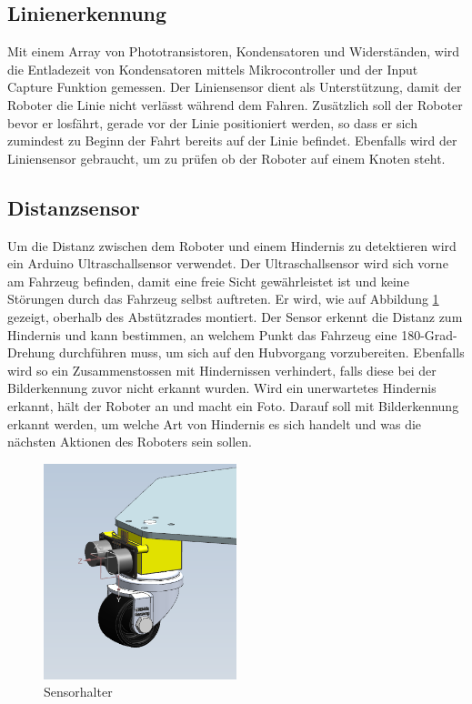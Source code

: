 \subsection{Linienerkennung}

Mit einem Array von Phototransistoren, Kondensatoren und Widerständen, wird die Entladezeit von Kondensatoren mittels Mikrocontroller und der Input Capture Funktion gemessen. Der Liniensensor dient als Unterstützung, damit der Roboter die Linie nicht verlässt während dem Fahren. Zusätzlich soll der Roboter bevor er losfährt, gerade vor der Linie positioniert werden, so dass er sich zumindest zu Beginn der Fahrt bereits auf der Linie befindet. Ebenfalls wird der Liniensensor gebraucht, um zu prüfen ob der Roboter auf einem Knoten steht.

\subsection{Distanzsensor}
\label{subsection:Distanzsensor}

Um die Distanz zwischen dem Roboter und einem Hindernis zu detektieren wird ein Arduino Ultraschallsensor verwendet. Der Ultraschallsensor wird sich vorne am Fahrzeug befinden, damit eine freie Sicht gewährleistet ist und keine Störungen durch das Fahrzeug selbst auftreten. Er wird, wie auf Abbildung \ref{fig:Prototype_Sensorhalter} gezeigt, oberhalb des Abstützrades montiert. Der Sensor erkennt die Distanz zum Hindernis und kann bestimmen, an welchem Punkt das Fahrzeug eine 180-Grad-Drehung durchführen muss, um sich auf den Hubvorgang vorzubereiten. Ebenfalls wird so ein Zusammenstossen mit Hindernissen verhindert, falls diese bei der Bilderkennung zuvor nicht erkannt wurden. Wird ein unerwartetes Hindernis erkannt, hält der Roboter an und macht ein Foto. Darauf soll mit Bilderkennung erkannt werden, um welche Art von Hindernis es sich handelt und was die nächsten Aktionen des Roboters sein sollen.

\begin{figure}[H]
\centering
\includegraphics[width=0.5\textwidth]{assets/prototyp-fahrwerk/Prototyp_Sensorhalter.png}
\caption{Sensorhalter}
\label{fig:Prototype_Sensorhalter}
\end{figure}



